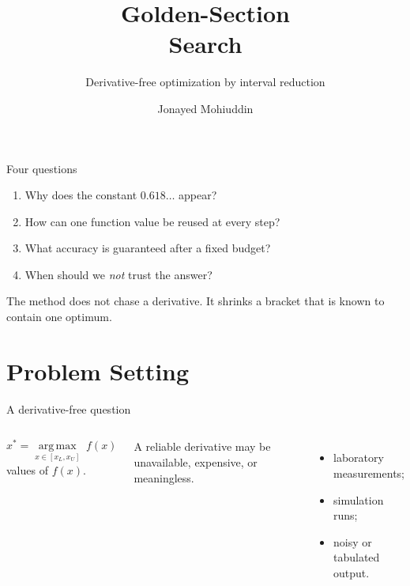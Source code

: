 \documentclass[aspectratio=169,11pt,t]{beamer}
\title{Golden-Section\\Search}
\subtitle{Derivative-free optimization by interval reduction}
\author{Jonayed Mohiuddin}
\date{}
\begin{document}
\begin{frame}
  \titlepage
\end{frame}

\begin{frame}{Four questions}
  \begin{enumerate}
    \item Why does the constant \(0.618\ldots\) appear?
    \item How can one function value be reused at every step?
    \item What accuracy is guaranteed after a fixed budget?
    \item When should we \emph{not} trust the answer?
  \end{enumerate}

  \begin{keyidea}
    The method does not chase a derivative. It shrinks a bracket that is known
    to contain one optimum.
  \end{keyidea}
\end{frame}


\section{Problem Setting}

\begin{frame}{A derivative-free question}
  \begin{columns}[T,onlytextwidth]
      {\fontsize{22}{27}\selectfont
      \[
        x^*=\underset{x\in[x_L,x_U]}{\operatorname{arg\,max}}\; f(x)
      \]
      }
       values of \(f(x)\).

      \vspace{0.20cm}
      A reliable derivative may be unavailable, expensive, or meaningless.

      \begin{itemize}
        \item laboratory measurements;
        \item simulation runs;
        \item noisy or tabulated output.
      \end{itemize}
  \end{columns}
\end{frame}
\end{document}
